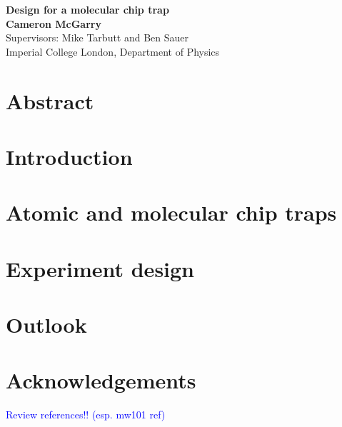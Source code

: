\documentclass[
 aps,
 a4paper,
 showpacs,
 superscriptaddress,
 notitlepage,
 nofootinbib,
 preprint %
]{revtex4-1}
\newcommand{\cm}[1]{\textcolor{blue}{#1}} %
\begin{document}

\begin{titlepage}
  \begin{center}
    \vspace*{1cm}
      \textbf{Design for a molecular chip trap} \\
    \vspace{1.5cm}
      \textbf{Cameron McGarry} \\
    \vspace{0.5cm}
       Supervisors: Mike Tarbutt and Ben Sauer \\
    \vspace{0.5cm}
       {Imperial College London, Department of Physics} \\
  \end{center}
\end{titlepage}

\section*{Abstract}

\clearpage

\tableofcontents
\clearpage

\setcounter{page}{4} 


\section{Introduction}


\section{Atomic and molecular chip traps}
\label{chiptraps}


\section{Experiment design}
\label{experiment}


\section{Outlook}
\label{outlook}


\clearpage

\section*{Acknowledgements}


\cm{Review references!! (esp. mw101 ref)}


\end{document}
